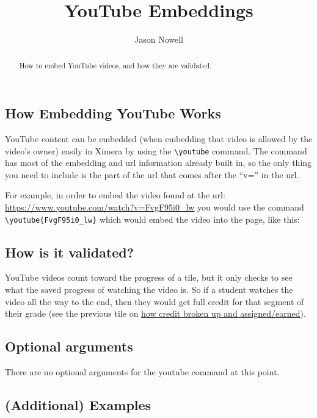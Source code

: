 \documentclass{ximera}
\title{YouTube Embeddings}
\author{Jason Nowell}
\begin{document}
\begin{abstract}
    How to embed YouTube videos, and how they are validated.
\end{abstract}
\maketitle

    \subsection*{How Embedding YouTube Works}
        YouTube content can be embedded (when embedding that video is allowed by the video's owner) easily in Ximera by using the \verb|\youtube| command. The command has most of the embedding and url information already built in, so the only thing you need to include is the part of the url that comes after the ``v='' in the url.
        
        For example, in order to embed the video found at the url: \url{https://www.youtube.com/watch?v=FvgF95i0_lw} you would use the command \verb|\youtube{FvgF95i0_lw}| which would embed the video into the page, like this:
        
    
    
    \subsection*{How is it validated?}
        YouTube videos count toward the progress of a tile, but it only checks to see what the saved progress of watching the video is. So if a student watches the video all the way to the end, then they would get full credit for that segment of their grade (see the previous tile on \href{https://xronos.clas.ufl.edu/examples/exampleCore/assignments/creditAllocation}{how credit broken up and assigned/earned}). 
        
        
    \subsection*{Optional arguments}
        There are no optional arguments for the youtube command at this point. 
    

    \subsection*{(Additional) Examples}
    
\end{document}
